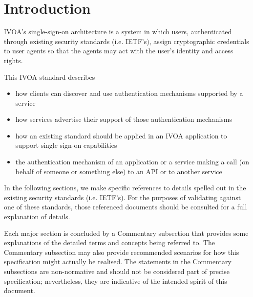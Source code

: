\documentclass[11pt,a4paper]{ivoa}
\begin{document}
\section{Introduction}

IVOA's single-sign-on architecture is a system in which users, 
authenticated through existing security standards (i.e. IETF's), assign
cryptographic credentials to user agents so that the agents may act with
the user's identity and access rights. 

This IVOA standard describes
         \begin{itemize}
              \item how clients can discover and use authentication 
                    mechanisms supported by a service
             \item how services advertise their support of those 
                    authentication mechanisms
	     \item how an existing standard should be applied in an IVOA 
              application to support single sign-on capabilities
              \item the authentication mechanism of an application or 
              a service making a call (on behalf of someone or something 
              else) to an API or to another service
          \end{itemize} 
In the following sections, we 
make specific references to details spelled out in the 
existing security standards (i.e. IETF's). For
the purposes of validating against one of these standards, those 
referenced
documents should be consulted for a full explanation of details.

Each major section is concluded by a Commentary subsection that provides
some explanations of the detailed terms and concepts being referred to.
The Commentary subsection may also provide recommended scenarios for how
this specification might actually be realised. The statements
in the Commentary subsections are non-normative and should not be
considered part of precise specification; nevertheless, they are
indicative of the intended spirit of this document.
\end{document}
